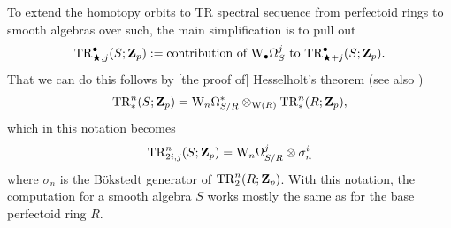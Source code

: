 \begin{notation}
  To extend the homotopy orbits to TR spectral sequence from perfectoid rings to smooth algebras over such, the main simplification is to pull out
  \[ \TR^\bullet_{\rog,j}(S;\Z_p) \defeq \text{contribution of $\dRW[\bullet]^j_S$ to $\TR^\bullet_{\rog+j}(S;\Z_p)$.} \]
  That we can do this follows by [the proof of] Hesselholt's theorem \cite{LarsPTyp} (see also \cite[Theorem 11]{HesselholtHandbook})
  \[ \TR^n_*(S;\Z_p) =  \dRW[n]^*_{S/R} \otimes_{\rmW(R)} \TR^n_*(R;\Z_p), \]
  which in this notation becomes
  \[ \TR^n_{2i,j}(S;\Z_p) = \dRW[n]^j_{S/R} \tnsr \sigma_n^i \]
  where $\sigma_n$ is the B\"okstedt generator of $\TR^n_2(R;\Z_p)$. With this notation, the computation for a smooth algebra $S$ works mostly the same as for the base perfectoid ring $R$.
\end{notation}

